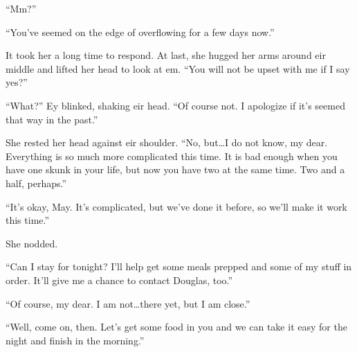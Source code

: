 ``Mm?''

``You've seemed on the edge of overflowing for a few days now.''

It took her a long time to respond. At last, she hugged her arms around eir middle and lifted her head to look at em. ``You will not be upset with me if I say yes?''

``What?'' Ey blinked, shaking eir head. ``Of course not. I apologize if it's seemed that way in the past.''

She rested her head against eir shoulder. ``No, but\ldots I do not know, my dear. Everything is so much more complicated this time. It is bad enough when you have one skunk in your life, but now you have two at the same time. Two and a half, perhaps.''

``It's okay, May. It's complicated, but we've done it before, so we'll make it work this time.''

She nodded.

``Can I stay for tonight? I'll help get some meals prepped and some of my stuff in order. It'll give me a chance to contact Douglas, too.''

``Of course, my dear. I am not\ldots there yet, but I am close.''

``Well, come on, then. Let's get some food in you and we can take it easy for the night and finish in the morning.''
